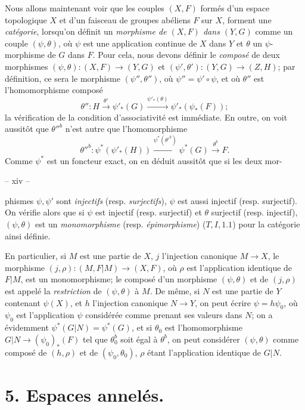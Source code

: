 Nous allons maintenant voir que les couples $(X, F)$ formés d'un espace topologique $X$ et d'un faisceau de groupes abéliens $F$ sur $X$, forment une \emph{catégorie}, lorsqu'on définit un \emph{morphisme de $(X, F)$ dans $(Y, G)$} comme un couple $(\psi, \theta)$, où $\psi$ est une application continue de $X$ dans $Y$ et $\theta$ un $\psi$-morphisme de $G$ dans $F$. Pour cela, nous devons définir le \emph{composé} de deux morphismes $(\psi, \theta): (X, F) \to (Y, G)$ et $(\psi', \theta') : (Y, G) \to (Z, H)$; par définition, ce sera le morphisme $(\psi'', \theta'')$, où $\psi'' = \psi' \circ \psi$, et où $\theta''$ est l'homomorphisme composé
$$\theta'': H \xrightarrow{\theta'} \psi'_*(G) \xrightarrow{\psi'_*(\theta)} \psi'_*(\psi_*(F));$$
la vérification de la condition d'associativité est immédiate. En outre, on voit aussitôt que $\theta''^b$ n'est autre que l'homomorphisme
$$\theta''^b: \psi^*(\psi'_*(H)) \xrightarrow{\psi^*(\theta'^b)} \psi^*(G) \xrightarrow{\theta^b} F.$$
Comme $\psi^*$ est un foncteur exact, on en déduit aussitôt que si les deux mor-

\newpage


-- xiv --

phismes $\psi, \psi'$ sont \emph{injectifs} (resp. \emph{surjectifs}), $\psi$ est aussi injectif (resp. surjectif). On vérifie alors que si $\psi$ est injectif (resp. surjectif) et $\theta$ surjectif (resp. injectif), $(\psi,\theta)$ est un \emph{monomorphisme} (resp. \emph{épimorphisme}) ($T, I, 1.1$) pour la catégorie ainsi définie.

En particulier, si $M$ est une partie de $X$, $j$ l'injection canonique $M \to X$, le morphisme $(j,\rho): (M, F|M) \to (X,F)$, où $\rho$ est l'application identique de $F|M$, est un monomorphisme; le composé d'un morphisme $(\psi,\theta)$ et de $(j,\rho)$ est appelé la \emph{restriction} de $(\psi,\theta)$ à $M$. De même, si $N$ est une partie de $Y$ contenant $\psi(X)$, et $h$ l'injection canonique $N \to Y$, on peut écrire $\psi = h\psi_0$, où $\psi_0$ est l'application $\psi$ considérée comme prenant ses valeurs dans $N$; on a évidemment $\psi^*(G|N) = \psi^*(G)$, et si $\theta_0$ est l'homomorphisme $G|N \to (\psi_0)_*(F)$ tel que $\theta_0^b$ soit égal à $\theta^b$, on peut considérer $(\psi,\theta)$ comme composé de $(h,\rho)$ et de $(\psi_0,\theta_0)$, $\rho$ étant l'application identique de $G|N$.

\section*{5. Espaces annelés.}

